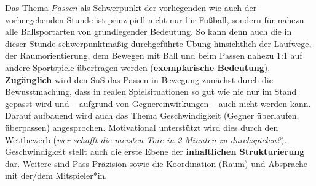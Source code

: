 Das Thema \emph{Passen} als Schwerpunkt der vorliegenden wie auch der
vorhergehenden Stunde ist prinzipiell nicht nur für Fußball, sondern für nahezu
alle Ballsportarten von grundlegender Bedeutung. So kann denn auch die in
dieser Stunde schwerpunktmäßig durchgeführte Übung hinsichtlich der Laufwege,
der Raumorientierung, dem Bewegen mit Ball und beim Passen nahezu 1:1 auf
andere Sportspiele übertragen werden (\textbf{exemplarische Bedeutung}).
\textbf{Zugänglich} wird den SuS das Passen in Bewegung zunächst durch die
Bewusstmachung, dass in realen Spielsituationen so gut wie nie nur im Stand
gepasst wird und -- aufgrund von Gegnereinwirkungen -- auch nicht werden kann.
Darauf aufbauend wird auch das Thema Geschwindigkeit (Gegner überlaufen,
überpassen) angesprochen. Motivational unterstützt wird dies durch den
Wettbewerb (\emph{wer schafft die meisten Tore in 2 Minuten zu durchspielen?}).
Geschwindigkeit stellt auch die erste Ebene der \textbf{inhaltlichen
Strukturierung} dar. Weitere sind Pass-Präzision sowie die Koordination (Raum)
und Absprache mit der/dem Mitspieler*in.
